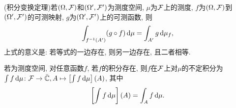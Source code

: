 \begin{theorem}
    (积分变换定理)若$(\Omega,\mathcal{F})$和$(\Omega',\mathcal{F}')$为测度空间, $\mu$为$\mathcal{F}$上的测度, $f$为$(\Omega,\mathcal{F})$到$(\Omega',\mathcal{F}')$的可测映射, $g$为$(\Omega',\mathcal{F}')$上的可测函数, 则
    \begin{equation}
        \int_{f^{-1}(A')}(g\circ f)\,\mathrm{d}\mu=\int_{A'}g\,\mathrm{d}\mu_f,
    \end{equation}
    上式的意义是: 若等式的一边存在, 则另一边存在, 且二者相等.
\end{theorem}

\begin{definition}
    若\s{}为测度空间, 对任意函数$f$, 若$f$的积分存在, 则$f$在$\mathcal{F}$上对$\mu$的不定积分为$\int f\,\mathrm{d}\mu\colon \mathcal{F}\to\bar{\mathbb{C}},A\mapsto\left[\int f\,\mathrm{d}\mu\right](A)$, 其中
    \begin{equation}
        \left[\int f\,\mathrm{d}\mu\right](A)=\int_A f\,\mathrm{d}\mu.
    \end{equation}
\end{definition}
